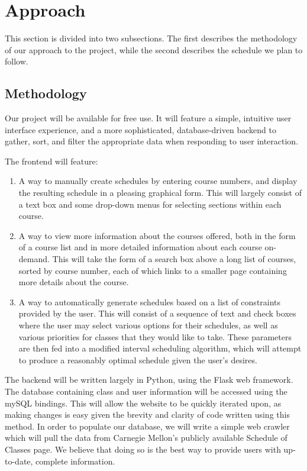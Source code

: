 \section{Approach}
This section is divided into two subsections. The first describes the methodology of our approach
to the project, while the second describes the schedule we plan to follow.

\subsection{Methodology}
Our project will be available for free use. It will feature a simple, intuitive user interface experience,
and a more sophisticated, database-driven backend to gather, sort, and filter the appropriate data 
when responding to user interaction.

The frontend will feature:
\begin{enumerate}
\item A way to manually create schedules by entering course numbers, and display the resulting schedule in a 
pleasing graphical form. This will largely consist of a text box and some drop-down menus for selecting 
sections within each course.
\item A way to view more information about the courses offered, both in the form of a course list and in
more detailed information about each course on-demand. This will take the form of a search box above a long 
list of courses, sorted by course number, each of which links to a smaller page containing more details about
the course.
\item A way to automatically generate schedules based on a list of constraints provided by the user. This will
consist of a sequence of text and check boxes where the user may select various options for their schedules,
as well as various priorities for classes that they would like to take. These parameters are then fed into a 
modified interval scheduling algorithm, which will attempt to produce a reasonably optimal schedule given the
user's desires.
\end{enumerate}

The backend will be written largely in Python, using the Flask web framework. The database containing class
and user information will be accessed using the mySQL bindings. This will allow the website to be quickly
iterated upon, as making changes is easy given the brevity and clarity of code written using this method.
In order to populate our database, we will write a simple web crawler which will pull the data from Carnegie
Mellon's publicly available Schedule of Classes page. We believe that doing so is the best way to provide
users with up-to-date, complete information.

